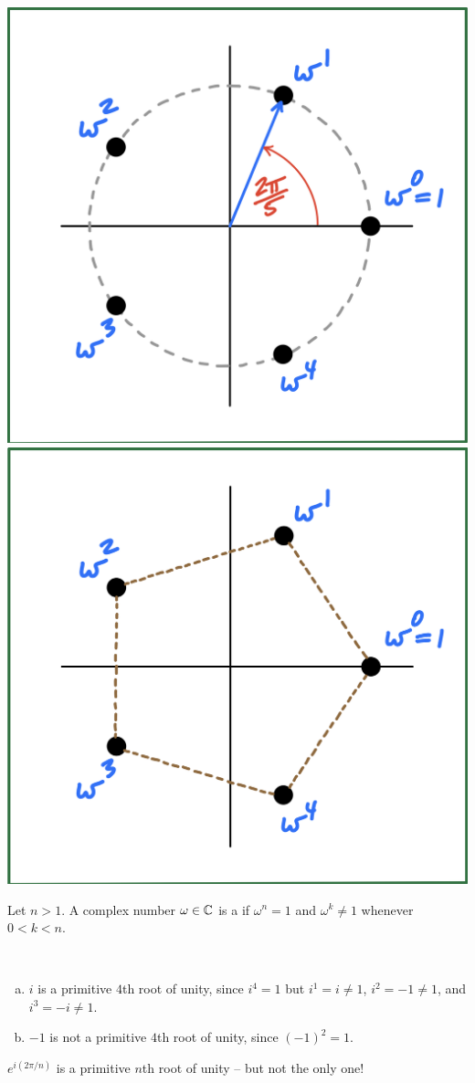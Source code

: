 \documentclass[11pt,fleqn,dvipsnames,usenames]{article}
\begin{document}
\begin{center}
\includegraphics[width=0.3\linewidth]{fifthrootsunity}\hspace{4cm} \includegraphics[width=0.3\linewidth]{fifthrootsunityhexagon}
\end{center}
%
\begin{definition} Let $n> 1$.  A complex number $\omega\in\mathbb{C}$ is a  if $\omega^{n} = 1$ and $\omega^{k}\neq 1$ whenever $0 < k < n$.
\end{definition}
%
\begin{examples}~
\begin{enumerate}[(a)]
\item $i$ is a primitive $4$th root of unity, since $i^{4} = 1$ but $i^{1} = i\neq 1$, $i^{2} = -1\neq 1$, and $i^3 = -i\neq 1$.
\item $-1$ is not a primitive $4$th root of unity, since $(-1)^2 = 1$.
\end{enumerate}
\end{examples}
\vsmsp

%
\note $e^{i(2\pi/n)}$ is a primitive $n$th root of unity -- but not the only one!
\vsmsp
\end{document}
